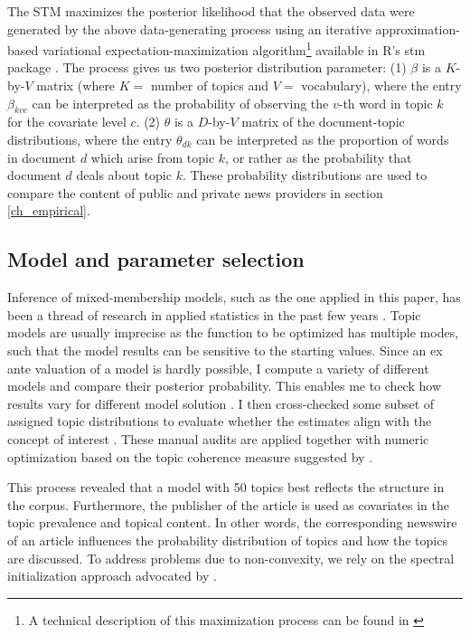 \documentclass[12pt,a4paper,notitlepage]{article}
\begin{document}
The STM maximizes the posterior likelihood that the observed data were generated by the above data-generating process using an iterative approximation-based variational expectation-maximization algorithm\footnote{A technical description of this maximization process can be found in \citet{roberts_model_2016}} available in R's stm package \citep{roberts_stm:_2016}. The process gives us two posterior distribution parameter: (1) $\beta$ is a $K$-by-$V$ matrix (where $K=$ number of topics and $V=$ vocabulary), where the entry $\beta_{kvc}$ can be interpreted as the probability of observing the $v$-th word in topic $k$ for the covariate level $c$. (2) $\theta$ is a $D$-by-$V$ matrix of the document-topic distributions, where the entry $\theta_{dk}$ can be interpreted as the proportion of words in document $d$ which arise from topic $k$, or rather as the probability that document $d$ deals about topic $k$. These probability distributions are used to compare the content of public and private news providers in section \ref{ch_empirical}.


\subsection{Model and parameter selection}

Inference of mixed-membership models, such as the one applied in this paper, has been a thread of research in applied statistics in the past few years \citep{blei_latent_2003} \citep{erosheva_mixed-membership_2004} \citep{braun_variational_2010}. Topic models are usually imprecise as the function to be optimized has multiple modes, such that the model results can be sensitive to the starting values. Since an ex ante valuation of a model is hardly possible, I compute a variety of different models and compare their posterior probability. This enables me to check how results vary for different model solution \citep{roberts_navigating_2016}. I then cross-checked some subset of assigned topic distributions to evaluate whether the estimates align with the concept of interest \citep{gentzkow_text_2017}. These manual audits are applied together with numeric optimization based on the topic coherence measure suggested by \citet{mimno_optimizing_2011}. 

This process revealed that a model with 50 topics best reflects the structure in the corpus. Furthermore, the publisher of the article is used as covariates in the topic prevalence and topical content. In other words, the corresponding newswire of an article influences the probability distribution of topics and how the topics are discussed. To address problems due to non-convexity, we rely on the spectral initialization approach advocated by \citet{roberts_navigating_2016}. 
\end{document}
